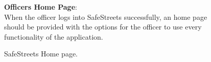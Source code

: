 \begin{figure}
	\begin{flushleft}
		\textbf{Officers Home Page}:\\
		When the officer logs into SafeStreets successfully, an home page should be provided with the options for the officer to use every functionality of the application.
	\end{flushleft}
	\centering
	\caption{SafeStreets Home page.}
	\label{fig:home2}
\end{figure}
\clearpage
